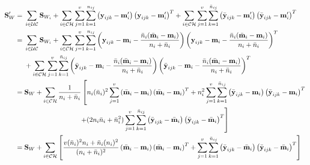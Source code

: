 \small
\begin{equation*}
\begin{split}
\textbf{S}_W' = \; & \sum\limits_{i \in \mathcal{UC}} \textbf{S}_{W_i} + \sum\limits_{i \in \mathcal{CH}} \sum_{j=1}^{v} \sum_{k=1}^{n_{ij}} \left( \textbf{y}_{ijk} - \textbf{m}_i' \right) \left( \textbf{y}_{ijk} - \textbf{m}_i' \right)^T + \sum\limits_{i \in \mathcal{CH}} \sum_{j=1}^{v} \sum_{k=1}^{\bar{n}_{ij}} \left( \bar{\textbf{y}}_{ijk} - \textbf{m}_i' \right) \left( \bar{\textbf{y}}_{ijk} - \textbf{m}_i' \right)^T
\\
= \; & \sum\limits_{i \in \mathcal{UC}} \textbf{S}_{W_i} + \sum\limits_{i \in \mathcal{CH}} \sum_{j=1}^{v} \sum_{k=1}^{n_{ij}} \left( \textbf{y}_{ijk} - \textbf{m}_i - \frac{\bar{n}_i (\bar{\textbf{m}}_i-\textbf{m}_i )}{n_i + \bar{n}_i} \right) \left( \textbf{y}_{ijk} - \textbf{m}_i - \frac{\bar{n}_i (\bar{\textbf{m}}_i-\textbf{m}_i )}{n_i + \bar{n}_i} \right)^T
\\
& + \sum\limits_{i \in \mathcal{CH}} \sum_{j=1}^{v} \sum_{k=1}^{\bar{n}_{ij}} \left( \bar{\textbf{y}}_{ijk} - \textbf{m}_i - \frac{\bar{n}_i (\bar{\textbf{m}}_i-\textbf{m}_i )}{n_i + \bar{n}_i} \right) \left( \bar{\textbf{y}}_{ijk} - \textbf{m}_i - \frac{\bar{n}_i (\bar{\textbf{m}}_i-\textbf{m}_i )}{n_i + \bar{n}_i} \right)^T
\\
= \; & \textbf{S}_W + \sum\limits_{i \in \mathcal{CH}} \frac{1}{n_i + \bar{n}_i} \left[ n_i (\bar{n}_i)^2 \sum_{j=1}^{v} \left( \bar{\textbf{m}}_i -\textbf{m}_i \right) \left( \bar{\textbf{m}}_i -\textbf{m}_i \right)^T + n_i^2 \sum_{j=1}^{v} \sum_{k=1}^{\bar{n}_{ij}} \left( \bar{\textbf{y}}_{ijk} - \textbf{m}_i \right) \left( \bar{\textbf{y}}_{ijk} - \textbf{m}_i \right)^T \right.
\\
& \left. \hspace{2.8cm} + (2 n_i \bar{n}_i + \bar{n}_i^2) \sum_{j=1}^{v} \sum_{k=1}^{\bar{n}_{ij}} \left( \bar{\textbf{y}}_{ijk} - \bar{\textbf{m}}_i \right) \left( \bar{\textbf{y}}_{ijk} - \bar{\textbf{m}}_i \right)^T \right]
\\
= \; & \textbf{S}_W + \sum\limits_{i \in \mathcal{CH}} \left[ \frac{v(\bar{n}_i)^2 n_i + \bar{n}_i(n_i)^2}{(n_i + \bar{n}_i)^2} \left( \bar{\textbf{m}}_i -\textbf{m}_i \right) \left( \bar{\textbf{m}}_i -\textbf{m}_i \right)^T + \sum_{j=1}^{v} \sum_{k=1}^{\bar{n}_{ij}} \left( \bar{\textbf{y}}_{ijk} - \bar{\textbf{m}}_i \right) \left( \bar{\textbf{y}}_{ijk} - \bar{\textbf{m}}_i \right)^T \right] \\
\end{split}
\end{equation*}

